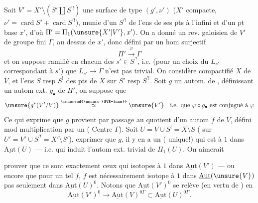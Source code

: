 Soit $V'=X'\setminus(S'\amalg S^{\prime!})$ une surface
  de type $(g',\nu')$
($X'$ compacte, $\nu'=\operatorname{card} S'+\operatorname{card} S^{\prime!}$),
munie d'un  $S^{\prime!}$ de l'ens de ses pts à l'infini
et d'un pt base $x'$, d'où $\Pi'=\Pi_1(\unsure{X'|V'},x')$.
On a donné un rev. galoisien  de $V'$ de groupe
fini $\Gamma$,  au dessus de $x'$, donc défini par un hom surjectif
\[
\Pi'\xrightarrow{\varphi}\Gamma
\]
et on suppose  ramifié en chacun des $s'\in S^{\prime!}$,
i.e. (pour un choix du   $L_{s'}$
correspondant à $s'$) que $L_{s'}\to\Gamma$ n'est pas trivial.
On considère  compactifié  $X$ de $V$,
et l'ens $S$ resp $S^!$ des pts de $X$ sur $S'$ resp $S^{\prime!}$.
Soit $g$ un autom. de , définissant un autom ext.
$g_\bullet$ de $\Pi'$, on suppose que
\[
\unsure{g^*(V'/V)}\overset{\text{\inserted{\unsure{$V$-isom}}}}{\simeq}\unsure{V'}
\quad\text{i.e. que }\varphi\circ g_\bullet\text{ est conjugué à }\varphi
\]
Ce qui exprime que $g$ provient par passage au quotient d'un autom $f$ de $V$,
défini mod multiplication par un 
 (\unsure{$=$|$\in$} Centre $\Gamma$).
Soit $U=V\cup S^!=X\setminus S$ ( sur
$U'=V'\cup S^{\prime!}=X'\setminus S'$),
  exprimer que
 
$g$, il y en a un ( unique!) qui est 
 à $1$ dans $\underline{\mathrm{Aut}}(U)$ --- i.e. qui induit
l'autom ext. trivial de $\Pi_1(U)$. On aimerait


prouver que ce sont exactement ceux qui  
isotopes à $1$ dans $\underline{\mathrm{Aut}}(V')$ --- ou encore que pour un tel $f$,
$f$ est nécessairement isotope à $1$ dans $\underline{\mathrm{Aut}}(\unsure{V})$
pas seulement dans $\underline{\mathrm{Aut}}(U)^0$.
Notons que 
$\underline{\mathrm{Aut}}(V')^0$ se relève (en vertu de ) en
\[
\underline{\mathrm{Aut}}(V')^0\longrightarrow
\underline{\mathrm{Aut}}(V)^{0\Gamma}\subset
\underline{\mathrm{Aut}}(U)^{0\Gamma}.
\]

